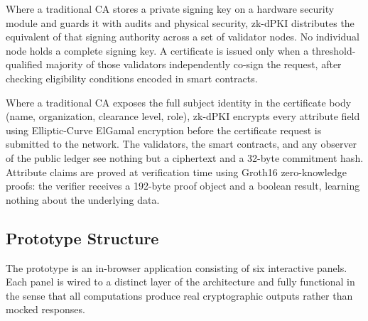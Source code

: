 \documentclass[12pt,a4paper]{article}
\begin{document}
Where a traditional CA stores a private signing key on a hardware security module and guards it with audits and physical security, zk-dPKI distributes the equivalent of that signing authority across a set of validator nodes. No individual node holds a complete signing key. A certificate is issued only when a threshold-qualified majority of those validators independently co-sign the request, after checking eligibility conditions encoded in smart contracts.

Where a traditional CA exposes the full subject identity in the certificate body (name, organization, clearance level, role), zk-dPKI encrypts every attribute field using Elliptic-Curve ElGamal encryption before the certificate request is submitted to the network. The validators, the smart contracts, and any observer of the public ledger see nothing but a ciphertext and a 32-byte commitment hash. Attribute claims are proved at verification time using Groth16 zero-knowledge proofs: the verifier receives a 192-byte proof object and a boolean result, learning nothing about the underlying data.

\subsection{Prototype Structure}

The prototype is an in-browser application consisting of six interactive panels. Each panel is wired to a distinct layer of the architecture and fully functional in the sense that all computations produce real cryptographic outputs rather than mocked responses.
\end{document}
